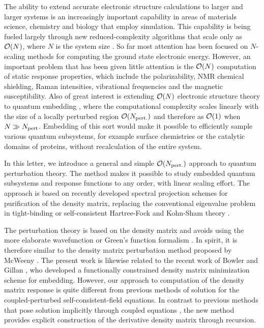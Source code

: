 \documentclass[prl,aps,twocolumn,showpacs,twocolumngrid,superbib]{revtex4}
\begin{document}
The ability to extend accurate electronic structure calculations to larger and larger systems 
is an increasingly important capability in areas of materials science, chemistry and biology
that employ simulation.  This capability is being fueled largely through new reduced-complexity 
algorithms that scale only as ${\cal O}(N)$, where $N$ is the system size \cite{Goedecker_RMP_99,Wu02}.  
So far most attention has been focused on $N$-scaling methods for computing the ground state electronic energy. 
However, an important problem that has been given little attention is the ${\cal O}(N)$ computation of static 
response properties, which include the polarizability, NMR chemical shielding, Raman intensities, vibrational 
frequencies and the magnetic susceptibility. Also of great interest is extending ${\cal O}(N)$ electronic
structure theory to quantum embedding \cite{Pantelides78,Haydock80,Inglesfield81}, where the computational 
complexity scales linearly with the size of a locally perturbed region ${\cal O}(N_{\rm pert.})$ and therefore 
as ${\cal O}(1)$ when $N \gg N_{\rm pert}$.  Embedding of this sort would make it possible to efficiently sample 
various quantum subsystems, for example surface chemistries or the catalytic domains of proteins, without 
recalculation of the entire system. 

In this letter, we introduce a general and simple ${\cal O}(N_{\rm pert.})$ approach to quantum perturbation theory.
The method makes it possible to study embedded quantum subsystems and response functions to any order, with linear 
scaling effort. The approach is based on recently developed spectral projection schemes
for purification of the density matrix, replacing the conventional
eigenvalue problem in tight-binding or self-consistent Hartree-Fock and Kohn-Sham theory
\cite{McWeeny60,Clinton69,Palser98,Holas01,NiklassonWLT,NiklassonSP2,NiklassonSP4,NiklassonIP}.

The perturbation theory is based on the density matrix and avoids using the more 
elaborate wavefunction or Green's function formalism \cite{Haydock80,Inglesfield81}.
In spirit, it is therefore similar to the density matrix perturbation method
proposed by McWeeny \cite{McWeeny_PRT}. The present work 
is likewise related to the recent work of Bowler and Gillan \cite{Bowler02},
who developed a functionally constrained density matrix minimization scheme for embedding.
However, our approach to computation of the density matrix response is quite different from 
previous methods of solution for the coupled-perturbed self-consistent-field equations.  
In contrast to previous methods that pose solution implicitly through coupled equations 
\cite{Frisch,Dupuis,Ochsenfeld,Larsen}, the new method provides explicit construction of the 
derivative density matrix through recursion.  
\end{document}
